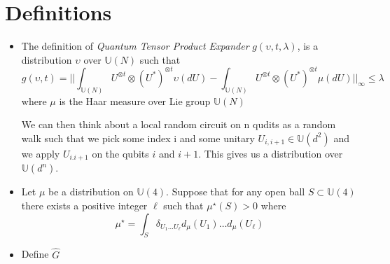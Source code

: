 \documentclass[a4paper]{article}
\begin{document}
\section{Definitions}
\label{sec:org8e4f993}
\begin{itemize}
\item The definition of \emph{Quantum Tensor Product Expander} \(g(\upsilon,t,\lambda)\), is a distribution \(\upsilon\) over \(\mathbb{U}(N)\) such that
$$ g(\upsilon, t) = || \int_{\mathbb{U}(N)} U^{\otimes t} \otimes (U^*)^{\otimes t} \upsilon(dU) - \int_{\mathbb{U}(N)} U^{\otimes t} \otimes (U^*)^{\otimes t} \mu(dU)||_{\infty} \leq \lambda $$
where \(\mu\) is the Haar measure over Lie group \(\mathbb{U}(N)\)

We can then think about a local random circuit on n qudits as a random walk such that we pick some index i and some unitary \(U_{i,i+1} \in \mathbb{U}(d^2)\) and we apply \(U_{i.i+1}\) on the qubits \(i\) and \(i+1\). This gives us a distribution over \(\mathbb{U}(d^n)\).
\item Let \(\mu\) be a distribution on \(\mathbb{U}(4)\). Suppose that for any open ball \(S \subset \mathbb{U}(4)\) there exists a positive integer \(\ell\) such that \(\mu^{\star}(S) > 0\) where $$\mu^{\star} = \int_{S} \delta_{U_1 \dots U_{\ell}} d_{\mu}(U_1)\dots d_{\mu}(U_{\ell}) $$

\item Define \(\hat{G}\)
\end{itemize}
\end{document}
